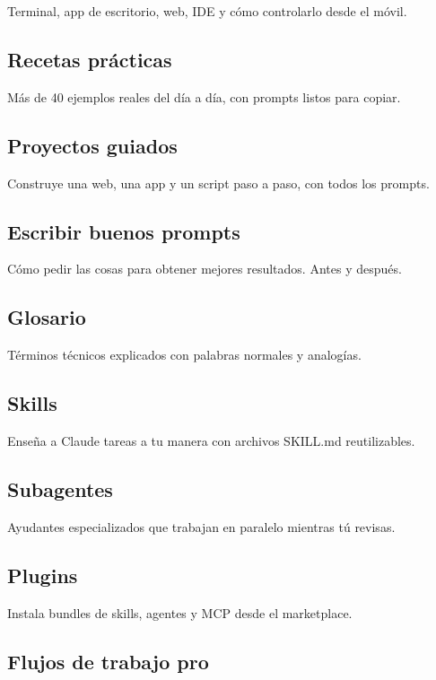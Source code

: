 \documentclass[11pt,a4paper]{report}
\begin{document}
Terminal, app de escritorio, web, IDE y cómo controlarlo desde el móvil.

\subsection{Recetas prácticas}

Más de 40 ejemplos reales del día a día, con prompts listos para copiar.

\subsection{Proyectos guiados}

Construye una web, una app y un script paso a paso, con todos los prompts.

\subsection{Escribir buenos prompts}

Cómo pedir las cosas para obtener mejores resultados. Antes y después.

\subsection{Glosario}

Términos técnicos explicados con palabras normales y analogías.

\subsection{Skills}

Enseña a Claude tareas a tu manera con archivos SKILL.md reutilizables.

\subsection{Subagentes}

Ayudantes especializados que trabajan en paralelo mientras tú revisas.

\subsection{Plugins}

Instala bundles de skills, agentes y MCP desde el marketplace.

\subsection{Flujos de trabajo pro}
\end{document}
